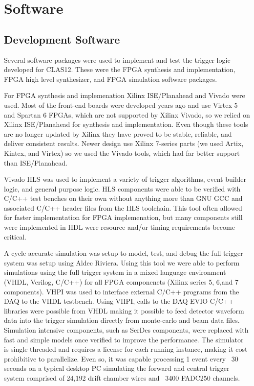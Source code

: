 \section{Software}



\subsection{Development Software}

Several software packages were used to implement and test the trigger logic developed for CLAS12. These were the FPGA synthesis and implementation, FPGA high level synthesizer, and FPGA simulation software packages.

For FPGA synthesis and implemenation Xilinx ISE/Planahead and Vivado were used. Most of the front-end boards were developed years ago and use Virtex 5 and Spartan 6 FPGAs, which are not supported by Xilinx Vivado, so we relied on Xilinx ISE/Planahead for synthesis and implementation. Even though these tools are no longer updated by Xilinx they have proved to be stable, reliable, and deliver consistent results. Newer design use Xilinx 7-series parts (we used Artix, Kintex, and Virtex) so we used the Vivado tools, which had far better support than ISE/Planahead.

Vivado HLS was used to implement a variety of trigger algorithms, event builder logic, and general purpose logic. HLS components were able to be verified with C/C++ test benches on their own without anything more than GNU GCC and associated C/C++ header files from the HLS toolchain. This tool often allowed for faster implementation for FPGA implemenation, but many components still were implemented in HDL were resource and/or timing requirements become critical.

A cycle accurate simulation was setup to model, test, and debug the full trigger system was setup using Aldec Riviera. Using this tool we were able to perform simulations using the full trigger system in a mixed language environment (VHDL, Verilog, C/C++) for all FPGA componenets (Xilinx series 5, 6,and 7 components). VHPI was used to interface external C/C++ programs from the DAQ to the VHDL testbench. Using VHPI, calls to the DAQ EVIO C/C++ libraries were possible from VHDL making it possible to feed detector waveform data into the trigger simulation directly from monte-carlo and beam data files. Simulation intensive components, such as SerDes components, were replaced with fast and simple models once verified to improve the performance. The simulator is single-threaded and requires a license for each running instance, making it cost prohibitive to parallelize. Even so, it was capable processing 1 event every ~30 seconds on a typical desktop PC simulating the forward and central trigger system comprised of 24,192 drift chamber wires and ~3400 FADC250 channels.


